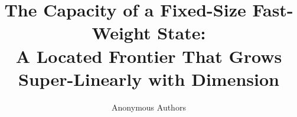 \documentclass{article}
\title{The Capacity of a Fixed-Size Fast-Weight State:\\
A Located Frontier That Grows Super-Linearly with Dimension}
\author{Anonymous Authors}
\begin{document}
\ifcolmsubmission
\linenumbers
\fi

\maketitle

\begin{abstract}

\end{abstract}












\end{document}
